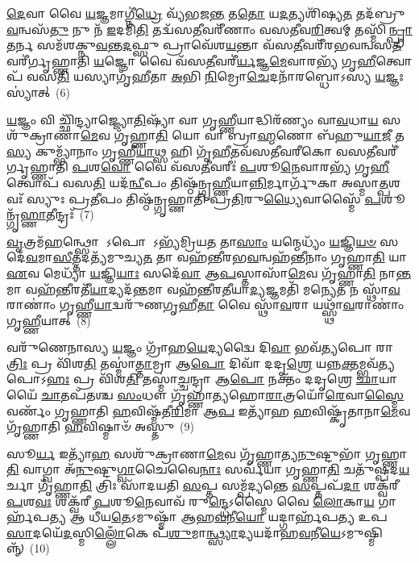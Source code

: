 {\anuvakamend[{𑌰𑍇𑌤𑍋᳴ \ul{𑌮𑌿}\-𑌤𑍍𑌰𑌾𑌵𑌰𑍁᳴𑌣𑍗 𑌗\-\ul{𑌚𑍍𑌛} 𑌸𑍍𑌵𑌾\-\ul{𑌹𑌾} 𑌨𑌭𑍋᳴ 𑌹𑍃𑌦𑌯\-\ul{𑌶𑍂}\-𑌲𑌂 𑌦𑍍𑌵𑌾𑌤𑍍𑌰𑌿𑍞᳴𑌶𑌚𑍍𑌚}]}%

\-\ul{𑌦𑍇}\-𑌵𑌾 𑌵𑍈 \ul{𑌯}\-𑌜𑍍𑌞𑌮𑌾𑌗𑍍𑌨𑍀॑\-\ul{𑌧𑍍𑌰𑍇} 𑌵𑍍𑌯᳴𑌭𑌜\-\ul{𑌨𑍍𑌤} 𑌤\-\ul{𑌤𑍋} 𑌯\-\ul{𑌦}\-𑌤𑍍𑌯𑌶𑌿᳴𑌷𑍍𑌯\-\ul{𑌤} 𑌤𑌦᳴𑌬𑍍𑌰𑍁\-\ul{𑌵}\-𑌨𑍍𑌵𑌸᳴\-\ul{𑌤𑍁} 𑌨𑍁 𑌨᳴ \ul{𑌇}\-𑌦𑌮𑌿\-\ul{𑌤𑌿} 𑌤𑌦𑍍𑌵᳴𑌸\-\ul{𑌤𑍀}\-𑌵𑌰𑍀᳴𑌣𑌾𑌂 𑌵𑌸𑌤𑍀𑌵\-\ul{𑌰𑌿}\-𑌤𑍍𑌵𑌮𑍍 𑌤𑌸𑍍𑌮𑌿᳴\-\ul{𑌨𑍍𑌪𑍍𑌰𑌾}\-𑌤𑌰𑍍𑌨 𑌸𑌮᳴𑌶𑌕𑍍𑌨𑍁\-\ul{𑌵}\-𑌨𑍍𑌤\-\ul{𑌦}\-𑌫𑍍𑌸𑍁 𑌪𑍍𑌰𑌾𑌵𑍇᳴𑌶\-\ul{𑌯}\-𑌨𑍍𑌤𑌾 𑌵᳴𑌸\-\ul{𑌤𑍀}\-𑌵𑌰𑍀᳴𑌰𑌭𑌵𑌨𑍍𑌵𑌸\-\ul{𑌤𑍀}\-𑌵𑌰𑍀॑𑌰𑍍𑌗𑍃𑌹𑍍𑌣𑌾𑌤𑌿 \ul{𑌯}\-𑌜𑍍𑌞𑍋 𑌵𑍈 𑌵᳴𑌸\-\ul{𑌤𑍀}\-𑌵𑌰𑍀॑\-\ul{𑌰𑍍𑌯}\-𑌜𑍍𑌞\-\ul{𑌮𑍇}\-𑌵𑌾𑌰𑌭𑍍𑌯᳴ 𑌗𑍃\-\ul{𑌹𑍀}\-𑌤𑍍𑌵𑍋𑌪᳴ 𑌵𑌸\-\ul{𑌤𑌿} 𑌯𑌸𑍍𑌯𑌾𑌗𑍃᳴𑌹𑍀𑌤𑌾 \ul{𑌅}\-𑌭𑌿 \ul{𑌨𑌿}\-𑌮𑍍𑌰𑍋\-\ul{𑌚𑍇}\-𑌦𑌨𑌾᳴𑌰𑌬𑍍𑌧𑍋\-𑌽𑌸𑍍𑌯 \ul{𑌯}\-𑌜𑍍𑌞𑌃 𑌸𑍍𑌯𑌾॑𑌤𑍍~(6)

\-\ul{𑌯}\-𑌜𑍍𑌞𑌂 𑌵𑌿 𑌚𑍍𑌛𑌿᳴𑌨𑍍𑌦𑍍𑌯𑌾𑌜𑍍𑌜𑍍𑌯𑍋\-\ul{𑌤𑌿}\-𑌷𑍍𑌯𑌾᳴ 𑌵𑌾 𑌗𑍃\-\ul{𑌹𑍍𑌣𑍀}\-𑌯𑌾𑌦𑍍𑌧𑌿𑌰᳴𑌣𑍍𑌯𑌂 𑌵𑌾\-\ul{𑌵}\-𑌧𑌾\-\ul{𑌯} 𑌸𑌶𑍁᳴𑌕𑍍𑌰𑌾𑌣𑌾\-\ul{𑌮𑍇}\-𑌵 𑌗𑍃᳴𑌹𑍍𑌣𑌾\-\ul{𑌤𑌿} 𑌯𑍋 𑌵𑌾॑ 𑌬𑍍𑌰𑌾\-\ul{𑌹𑍍𑌮}\-𑌣𑍋 𑌬᳴𑌹𑍁\-\ul{𑌯𑌾}\-𑌜𑍀 𑌤\-\ul{𑌸𑍍𑌯} 𑌕𑍁𑌮𑍍𑌭𑍍𑌯𑌾᳴𑌨𑌾𑌂 𑌗𑍃𑌹𑍍𑌣𑍀\-\ul{𑌯𑌾}\-𑌥𑍍𑌸 𑌹𑌿 𑌗𑍃᳴\-\ul{𑌹𑍀}\-𑌤𑌵᳴𑌸𑌤𑍀𑌵𑌰𑍀𑌕𑍋 𑌵𑌸\-\ul{𑌤𑍀}\-𑌵𑌰𑍀॑𑌰𑍍𑌗𑍃𑌹𑍍𑌣𑌾𑌤𑌿 \ul{𑌪}\-𑌶\-\ul{𑌵𑍋} 𑌵𑍈 𑌵᳴𑌸\-\ul{𑌤𑍀}\-𑌵𑌰𑍀𑌃॑ \ul{𑌪}\-𑌶𑍂\-\ul{𑌨𑍇}\-𑌵𑌾𑌰𑌭𑍍𑌯᳴ 𑌗𑍃\-\ul{𑌹𑍀}\-𑌤𑍍𑌵𑍋𑌪᳴ 𑌵𑌸\-\ul{𑌤𑌿} 𑌯𑌦᳴\-\ul{𑌨𑍍𑌵𑍀}\-𑌪𑌂 𑌤𑌿𑌷𑍍𑌠᳴𑌨𑍍𑌗𑍃\-\ul{𑌹𑍍𑌣𑍀}\-𑌯𑌾\-\ul{𑌨𑍍𑌨𑌿}\-𑌰𑍍𑌮𑌾𑌰𑍍𑌗𑍁᳴𑌕𑌾 𑌅𑌸𑍍𑌮𑌾\-\ul{𑌤𑍍𑌪}\-𑌶𑌵𑌃᳴ 𑌸𑍍𑌯𑍁𑌃 𑌪𑍍𑌰\-\ul{𑌤𑍀}\-𑌪𑌂 𑌤𑌿𑌷𑍍𑌠᳴𑌨𑍍𑌗𑍃𑌹𑍍𑌣𑌾𑌤𑌿 𑌪𑍍𑌰\-\ul{𑌤𑌿}\-𑌰𑍁\-\ul{𑌧𑍍𑌯𑍈}\-𑌵𑌾𑌸𑍍𑌮𑍈᳴ \ul{𑌪}\-𑌶𑍂𑌨𑍍𑌗𑍃᳴\-\ul{𑌹𑍍𑌣𑌾}\-𑌤𑍀𑌨𑍍𑌦𑍍𑌰𑌃᳴~(7)

\-\ul{𑌵𑍃}\-𑌤𑍍𑌰𑌮᳴\-\ul{𑌹}\-𑌨𑍍𑌥𑍍𑌸𑍋 \-𑌽𑌪𑍋 \-𑌽𑌭𑍍𑌯᳴𑌮𑍍𑌰𑌿𑌯\-\ul{𑌤} 𑌤𑌾\-\ul{𑌸𑌾𑌂} 𑌯𑌨𑍍𑌮𑍇𑌧𑍍𑌯𑌂᳴ \ul{𑌯}\-𑌜𑍍𑌞𑌿\-\ul{𑌯}\-\-\ul{𑍞} 𑌸𑌦𑍇᳴\-\ul{𑌵}\-𑌮𑌾\-\ul{𑌸𑍀}\-𑌤𑍍𑌤𑌦𑌤𑍍𑌯᳴𑌮𑍁𑌚𑍍𑌯\-\ul{𑌤} 𑌤𑌾 𑌵𑌹᳴𑌨𑍍𑌤𑍀𑌰𑌭\-\ul{𑌵}\-𑌨𑍍𑌵𑌹᳴𑌨𑍍𑌤𑍀𑌨𑌾𑌂 𑌗𑍃𑌹𑍍𑌣𑌾\-\ul{𑌤𑌿} 𑌯𑌾 \ul{𑌏}\-𑌵 𑌮𑍇𑌧𑍍𑌯𑌾᳴ \ul{𑌯}\-𑌜𑍍𑌞𑌿\-\ul{𑌯𑌾𑌃} 𑌸𑌦𑍇᳴\-\ul{𑌵𑌾} 𑌆\-\ul{𑌪}\-𑌸𑍍𑌤𑌾𑌸𑌾᳴\-\ul{𑌮𑍇}\-𑌵 𑌗𑍃᳴𑌹𑍍𑌣𑌾\-\ul{𑌤𑌿} 𑌨𑌾\-\ul{𑌨𑍍𑌤}\-𑌮𑌾 𑌵𑌹᳴\-\ul{𑌨𑍍𑌤𑍀}\-𑌰𑌤𑍀᳴\-\ul{𑌯𑌾}\-𑌦𑍍𑌯𑌦᳴\-\ul{𑌨𑍍𑌤}\-𑌮𑌾 𑌵𑌹᳴𑌨𑍍𑌤𑍀𑌰\-\ul{𑌤𑍀}\-𑌯𑌾\-\ul{𑌦𑍍𑌯}\-𑌜𑍍𑌞𑌮𑌤𑌿᳴ 𑌮𑌨𑍍𑌯𑍇\-\ul{𑌤} 𑌨 𑌸𑍍𑌥𑌾᳴\-\ul{𑌵}\-𑌰𑌾𑌣𑌾𑌂॑ 𑌗𑍃𑌹𑍍𑌣𑍀\-\ul{𑌯𑌾}\-𑌦𑍍𑌵𑌰𑍁᳴𑌣𑌗𑍃𑌹𑍀\-\ul{𑌤𑌾} 𑌵𑍈 𑌸𑍍𑌥𑌾᳴\-\ul{𑌵}\-𑌰𑌾 𑌯𑌥𑍍𑌸𑍍𑌥𑌾᳴\-\ul{𑌵}\-𑌰𑌾𑌣𑌾𑌂॑ 𑌗𑍃\-\ul{𑌹𑍍𑌣𑍀}\-𑌯𑌾𑌤𑍍~(8)

𑌵𑌰𑍁᳴𑌣𑍇𑌨𑌾𑌸𑍍𑌯 \ul{𑌯}\-𑌜𑍍𑌞𑌂 𑌗𑍍𑌰𑌾᳴𑌹\-\ul{𑌯𑍇}\-𑌦𑍍𑌯𑌦𑍍𑌵𑍈 𑌦𑌿\-\ul{𑌵𑌾} 𑌭𑌵᳴\-\ul{𑌤𑍍𑌯}\-𑌪𑍋 𑌰𑌾\-\ul{𑌤𑍍𑌰𑌿𑌃} 𑌪𑍍𑌰 𑌵𑌿᳴𑌶\-\ul{𑌤𑌿} 𑌤𑌸𑍍𑌮𑌾॑\-\ul{𑌤𑍍𑌤𑌾}\-𑌮𑍍𑌰𑌾 𑌆\-\ul{𑌪𑍋} 𑌦𑌿𑌵𑌾᳴ 𑌦𑌦𑍃\-\ul{𑌶𑍍𑌰𑍇} 𑌯𑌨𑍍𑌨\-\ul{𑌕𑍍𑌤}\-𑌮𑍍𑌭𑌵᳴\-\ul{𑌤𑍍𑌯}\-𑌪𑍋\-𑌽\-\ul{𑌹𑌃} 𑌪𑍍𑌰 𑌵𑌿᳴𑌶\-\ul{𑌤𑌿} 𑌤𑌸𑍍𑌮𑌾॑\-\ul{𑌚𑍍𑌚}\-𑌨𑍍𑌦𑍍𑌰𑌾 𑌆\-\ul{𑌪𑍋} 𑌨𑌕𑍍𑌤𑌂᳴ 𑌦𑌦𑍃𑌶𑍍𑌰𑍇 \ul{𑌛𑌾}\-𑌯𑌾𑌯𑍈᳴ \ul{𑌚𑌾}\-𑌤𑌪᳴𑌤𑌶𑍍𑌚 \ul{𑌸𑌂}\-𑌧𑍗 𑌗𑍃᳴𑌹𑍍𑌣𑌾𑌤𑍍𑌯𑌹𑍋\-\ul{𑌰𑌾}\-𑌤𑍍𑌰𑌯𑍋᳴\-\ul{𑌰𑍇}\-𑌵𑌾\-\ul{𑌸𑍍𑌮𑍈} 𑌵𑌰𑍍𑌣𑌂᳴ 𑌗𑍃𑌹𑍍𑌣𑌾𑌤𑌿 \ul{𑌹}\-𑌵𑌿𑌷𑍍𑌮᳴𑌤𑍀\-\ul{𑌰𑌿}\-𑌮𑌾 𑌆\-\ul{𑌪} 𑌇𑌤𑍍𑌯𑌾᳴𑌹 \ul{𑌹}\-𑌵𑌿𑌷𑍍𑌕𑍃᳴𑌤𑌾𑌨𑌾\-\ul{𑌮𑍇}\-𑌵 𑌗𑍃᳴𑌹𑍍𑌣𑌾𑌤𑌿 \ul{𑌹}\-𑌵𑌿𑌷𑍍𑌮𑌾𑍞᳴ 𑌅𑌸𑍍𑌤𑍁~(9)

𑌸𑍂\-\ul{𑌰𑍍𑌯} 𑌇𑌤𑍍𑌯𑌾᳴\-\ul{𑌹} 𑌸𑌶𑍁᳴𑌕𑍍𑌰𑌾𑌣𑌾\-\ul{𑌮𑍇}\-𑌵 𑌗𑍃᳴𑌹𑍍𑌣𑌾𑌤𑍍𑌯\-\ul{𑌨𑍁}\-𑌷𑍍𑌟𑍁𑌭𑌾᳴ 𑌗𑍃𑌹𑍍𑌣𑌾\-\ul{𑌤𑌿} 𑌵𑌾𑌗𑍍𑌵𑌾 𑌅᳴\-\ul{𑌨𑍁}\-𑌷𑍍𑌟𑍁\-\ul{𑌗𑍍𑌵𑌾}\-𑌚𑍈𑌵𑍈\-\ul{𑌨𑌾𑌃} 𑌸𑌰𑍍𑌵᳴𑌯𑌾 𑌗𑍃𑌹𑍍𑌣𑌾\-\ul{𑌤𑌿} 𑌚𑌤𑍁᳴𑌷𑍍𑌪𑌦\-\ul{𑌯}\-𑌰𑍍𑌚𑌾 𑌗𑍃᳴𑌹𑍍𑌣𑌾\-\ul{𑌤𑌿} 𑌤𑍍𑌰𑌿𑌃 𑌸𑌾᳴𑌦𑌯𑌤𑌿 \ul{𑌸}\-𑌪𑍍𑌤 𑌸𑌮𑍍𑌪᳴𑌦𑍍𑌯𑌨𑍍𑌤𑍇 \ul{𑌸}\-𑌪𑍍𑌤𑌪᳴\-\ul{𑌦𑌾} 𑌶𑌕𑍍𑌵᳴𑌰𑍀 \ul{𑌪}\-𑌶\-\ul{𑌵𑌃} 𑌶𑌕𑍍𑌵᳴𑌰𑍀 \ul{𑌪}\-𑌶𑍂\-\ul{𑌨𑍇}\-𑌵𑌾𑌵᳴ 𑌰𑍁\-\ul{𑌨𑍍𑌦𑍍𑌧𑍇}\-\-𑌽𑌸𑍍𑌮𑍈 𑌵𑍈 \ul{𑌲𑍋}\-𑌕𑌾\-\ul{𑌯} 𑌗𑌾𑌰𑍍\mbox{}𑌹᳴𑌪\-\ul{𑌤𑍍𑌯} 𑌆 𑌧𑍀᳴𑌯\-\ul{𑌤𑍇}\-\-𑌽𑌮𑍁𑌷𑍍𑌮𑌾᳴ 𑌆𑌹\-\ul{𑌵}\-𑌨𑍀\-\ul{𑌯𑍋} 𑌯𑌦𑍍𑌗𑌾𑌰𑍍\mbox{}𑌹᳴𑌪𑌤𑍍𑌯 𑌉𑌪\-\ul{𑌸𑌾}\-𑌦𑌯𑍇᳴\-\ul{𑌦}\-𑌸𑍍𑌮𑌿\-\ul{𑌲𑍍𑌲𑍋𑌁}\-𑌕𑍇 𑌪᳴\-\ul{𑌶𑍁}\-𑌮𑌾\-\ul{𑌨𑍍𑌥𑍍𑌸𑍍𑌯𑌾}\-𑌦𑍍𑌯𑌯𑌦𑌾᳴𑌹\-\ul{𑌵}\-𑌨𑍀\-\ul{𑌯𑍇}\-\-𑌽𑌮𑍁𑌷𑍍𑌮𑌿𑌨𑍍𑌨𑍍᳴~(10)

